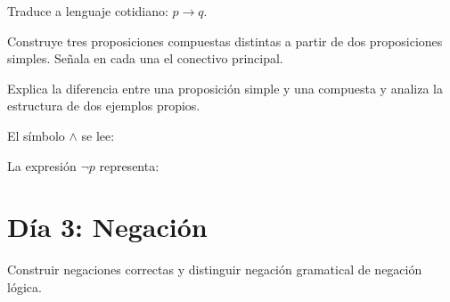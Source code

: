 \begin{activity}[id=dia-02-corta-06,type=short,weight=1]

Traduce a lenguaje cotidiano: \(p \to q\).

\end{activity}

\begin{activity}[id=dia-02-desarrollo-01,type=long,weight=2]

Construye tres proposiciones compuestas distintas a partir de dos proposiciones simples. Señala en cada una el conectivo principal.

\end{activity}

\begin{activity}[id=dia-02-desarrollo-02,type=long,weight=2]

Explica la diferencia entre una proposición simple y una compuesta y analiza la estructura de dos ejemplos propios.

\end{activity}

\begin{activity}[id=dia-02-opcion-01,type=choice,weight=1]

El símbolo \(\land\) se lee:





\end{activity}

\begin{activity}[id=dia-02-opcion-02,type=choice,weight=1]

La expresión \(\neg p\) representa:





\end{activity}

\section{Día 3: Negación}

\begin{lesson}[id=dia-03-lectura,weight=0]

Construir negaciones correctas y distinguir negación gramatical de negación lógica.

\end{lesson}

